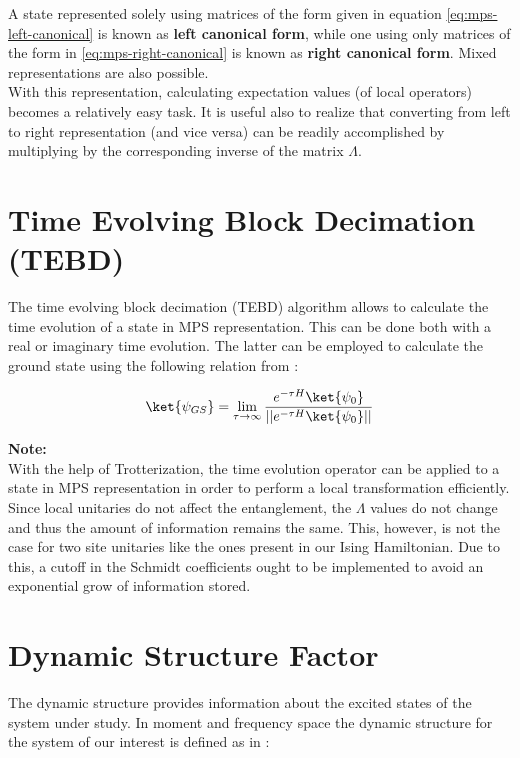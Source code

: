 A state represented solely using matrices of the form given in equation \ref{eq:mps-left-canonical} is known as \textbf{left canonical form}, while one using only matrices of the form in \ref{eq:mps-right-canonical} is known as \textbf{right canonical form}.
Mixed representations are also possible.\\

With this representation, calculating expectation values (of local operators) becomes a relatively easy task. It is useful also to realize that converting from left to right representation (and vice versa) can be readily accomplished by multiplying by the corresponding inverse of the matrix $\Lambda$.

\section{Time Evolving Block Decimation (TEBD)}

The time evolving block decimation (TEBD) algorithm allows to calculate the time evolution of a state in MPS representation.
This can be done both with a real or imaginary time evolution.
The latter can be employed to calculate the ground state using the following relation from \cite{anleitung}:

\begin{equation}
    \ket{\psi_{GS}} = \lim_{\tau \rightarrow \infty} \frac{e^{-\tau H}\ket{\psi_0}}{||e^{-\tau H}\ket{\psi_0}||}
    \label{eq:tebd-gs}
\end{equation}    

\textbf{Note:}\\
With the help of Trotterization, the time evolution operator can be applied to a state in MPS representation in order to perform a local transformation efficiently.
Since local unitaries do not affect the entanglement, the $\Lambda$ values do not change and thus the amount of information remains the same.
This, however, is not the case for two site unitaries like the ones present in our Ising Hamiltonian. 
Due to this, a cutoff in the Schmidt coefficients ought to be implemented to avoid an exponential grow of information stored.

\section{Dynamic Structure Factor}

The dynamic structure provides information about the excited states of the system under study.
In moment and frequency space the dynamic structure for the system of our interest is defined as in \cite{anleitung}:

